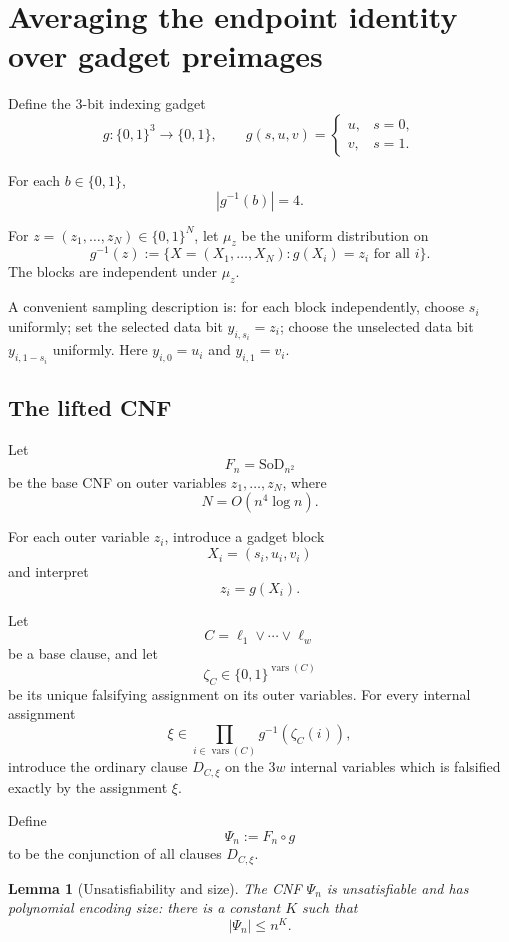 \documentclass[11pt]{article}
\newtheorem{lemma}[theorem]{Lemma}
\theoremstyle{definition}
\newcommand{\bits}{\{0,1\}}
\newcommand{\SoD}{\mathrm{SoD}}
\begin{document}
\section{Averaging the endpoint identity over gadget preimages}\label{sec:averaging}

Define the $3$-bit indexing gadget
\[
  g:\bits^3\to\bits,
  \qquad
  g(s,u,v)=
  \begin{cases}
  u,&s=0,\\
  v,&s=1.
  \end{cases}
  \tag{3.1}\label{eq:index}
\]

For each $b\in\bits$,
\[
  |g^{-1}(b)|=4.
\]

For $z=(z_1,\dots,z_N)\in\bits^N$, let $\mu_z$ be the uniform distribution on
\[
  g^{-1}(z)
  :=
  \{X=(X_1,\dots,X_N):g(X_i)=z_i\text{ for all }i\}.
\]
The blocks are independent under $\mu_z$.

A convenient sampling description is:
for each block independently, choose $s_i$ uniformly;
set the selected data bit $y_{i,s_i}=z_i$;
choose the unselected data bit $y_{i,1-s_i}$ uniformly.
Here $y_{i,0}=u_i$ and $y_{i,1}=v_i$.

\subsection{The lifted CNF}

Let
\[
  F_n=\SoD_{n^2}
\]
be the base CNF on outer variables $z_1,\dots,z_N$, where
\[
  N=O(n^4\log n).
\]

For each outer variable $z_i$, introduce a gadget block
\[
  X_i=(s_i,u_i,v_i)
\]
and interpret
\[
  z_i=g(X_i).
\]

Let
\[
  C=\ell_1\vee\cdots\vee\ell_w
\]
be a base clause, and let
\[
  \zeta_C\in\bits^{\operatorname{vars}(C)}
\]
be its unique falsifying assignment on its outer variables.
For every internal assignment
\[
  \xi\in
  \prod_{i\in\operatorname{vars}(C)}g^{-1}(\zeta_C(i)),
\]
introduce the ordinary clause $D_{C,\xi}$ on the $3w$ internal variables which is
falsified exactly by the assignment $\xi$.

Define
\[
  \Psi_n:=F_n\circ g
\]
to be the conjunction of all clauses $D_{C,\xi}$.

\begin{lemma}[Unsatisfiability and size]\label{lem:lift-size}
The CNF $\Psi_n$ is unsatisfiable and has polynomial encoding size:
there is a constant $K$ such that
\[
  |\Psi_n|\le n^K.
  \tag{3.2}\label{eq:polysize}
\]
\end{lemma}
\end{document}
